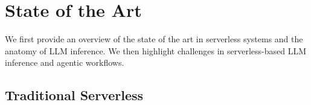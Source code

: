 \section{State of the Art}

We first provide an overview of the state of the art in serverless systems and the anatomy of LLM inference.  
We then highlight challenges in serverless-based LLM inference and agentic workflows. 








\subsection{Traditional Serverless}

